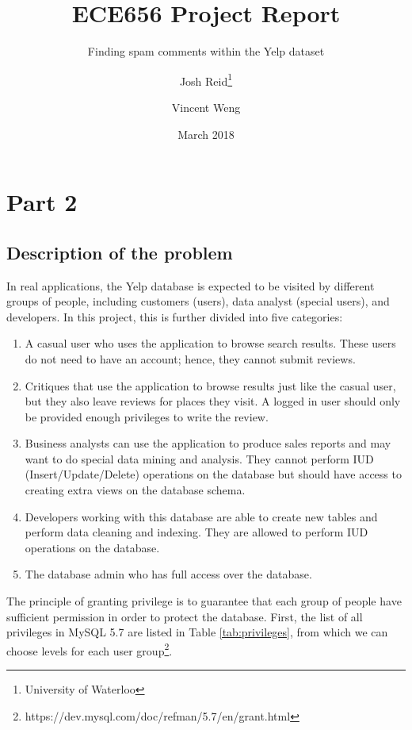 \documentclass[12pt]{scrbook}
\title{ECE656 Project Report}
\subtitle{Finding spam comments within the Yelp dataset}
\date{March 2018}
\author{Josh Reid\thanks{University of Waterloo}
\and Vincent Weng\footnotemark[1]}
\begin{document}
\section{Part 2}
\subsection{Description of the problem}
    In real applications, the Yelp database is expected to be visited by different groups of people,
	including customers (users), data analyst (special users), and developers. In this project, this
	is further divided into five categories:
    \begin{enumerate}
      \item A casual user who uses the application to browse search results. These users do not need
		to have an account; hence, they cannot submit reviews.
      \item Critiques that use the application to browse results just like the casual user, but they
		also leave reviews for places they visit. A logged in user should only be provided enough
		privileges to write the review.
      \item Business analysts can use the application to produce sales reports and may want to do
		special data mining and analysis. They cannot perform IUD (Insert/Update/Delete) operations on
		the database but should have access to creating extra views on the database schema.
      \item Developers working with this database are able to create new tables and perform data
		cleaning and indexing. They are allowed to perform IUD operations on the database.
      \item The database admin who has full access over the database.
    \end{enumerate} 

    The principle of granting privilege is to guarantee that each group of people have sufficient
	permission in order to protect the database. First, the list of all privileges in MySQL 5.7 are
	listed in Table \ref{tab:privileges}, from which we can choose levels for each user
	group\footnote{https://dev.mysql.com/doc/refman/5.7/en/grant.html}. 
\end{document}
